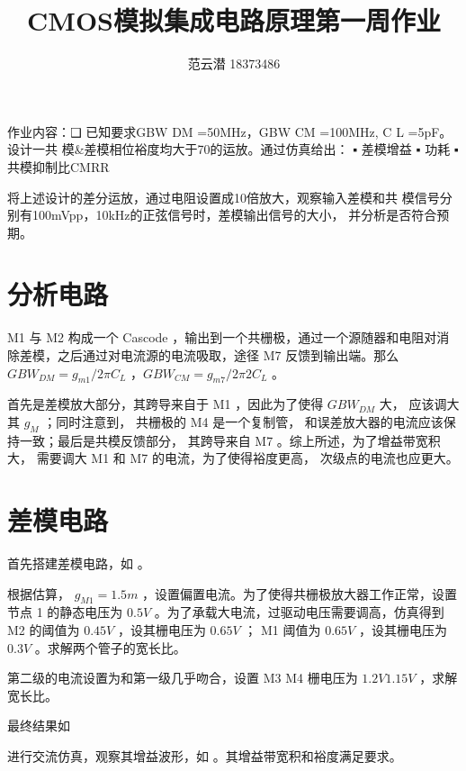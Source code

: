 \documentclass[lang=cn,11pt,a4paper,cite=authoryear]{elegantpaper}
\title{CMOS模拟集成电路原理\quad 第一周作业}
\author{范云潜 18373486}
\institute{微电子学院 184111 班}
\date{\zhtoday}
\begin{document}
\maketitle

作业内容：❑ 已知要求GBW DM =50MHz，GBW CM =100MHz, C L =5pF。设计一共
模\&差模相位裕度均大于70的运放。通过仿真给出：
▪ 差模增益
▪ 功耗
▪ 共模抑制比CMRR

将上述设计的差分运放，通过电阻设置成10倍放大，观察输入差模和共
模信号分别有100mVpp，10kHz的正弦信号时，差模输出信号的大小，
并分析是否符合预期。


\listoffigures


\section{分析电路}

M1 与 M2 构成一个 Cascode ，输出到一个共栅极，通过一个源随器和电阻对消除差模，之后通过对电流源的电流吸取，途径 M7 反馈到输出端。那么 \(GBW_{DM} = g_{m1}/2 \pi C_L\) ，\(GBW_{CM} = g_{m7} / 2 \pi 2 C_L\) 。

首先是差模放大部分，其跨导来自于 M1 ，因此为了使得 \(GBW_{DM}\) 大， 应该调大其 \(g_M\) ；同时注意到， 共栅极的 M4 是一个复制管， 和误差放大器的电流应该保持一致；最后是共模反馈部分， 其跨导来自 M7 。综上所述，为了增益带宽积大， 需要调大 M1 和 M7 的电流，为了使得裕度更高， 次级点的电流也应更大。


\section{差模电路}

首先搭建差模电路，如  。

根据估算， \(g_{M1} = 1.5 m\) ，设置偏置电流。为了使得共栅极放大器工作正常，设置节点 1 的静态电压为 \(0.5 V\) 。为了承载大电流，过驱动电压需要调高，仿真得到 M2 的阈值为 \(0.45 V\) ，设其栅电压为 \(0.65 V\) ； M1 阈值为 \(0.65 V\) ，设其栅电压为 \(0.3 V\) 。求解两个管子的宽长比。


第二级的电流设置为和第一级几乎吻合，设置 M3 M4 栅电压为 \(1.2 V 1.15 V\) ，求解宽长比。

最终结果如 


进行交流仿真，观察其增益波形，如 。其增益带宽积和裕度满足要求。
\end{document}

